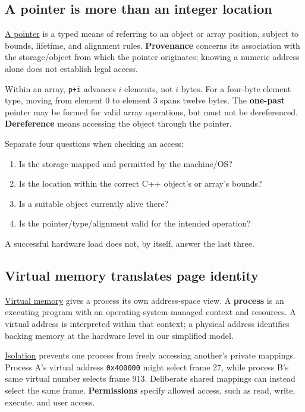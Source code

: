 \subsection{A pointer is more than an integer location}\label{01-foundations-i-ch002-a-pointer-is-more-than-an-integer-location}

\hyperref[appendix-6af5921bc853]{A pointer} is a typed means of referring to an object or array position, subject to bounds, lifetime, and alignment rules. \textbf{Provenance} concerns its association with the storage/object from which the pointer originates; knowing a numeric address alone does not establish legal access.

Within an array, \texttt{p+i} advances \(i\) elements, not \(i\) bytes. For a four-byte element type, moving from element 0 to element 3 spans twelve bytes. The \textbf{one-past} pointer may be formed for valid array operations, but must not be dereferenced. \textbf{Dereference} means accessing the object through the pointer.

Separate four questions when checking an access:

\begin{enumerate}
\def\labelenumi{\arabic{enumi}.}
\tightlist
\item
  Is the storage mapped and permitted by the machine/OS?
\item
  Is the location within the correct C++ object's or array's bounds?
\item
  Is a suitable object currently alive there?
\item
  Is the pointer/type/alignment valid for the intended operation?
\end{enumerate}

A successful hardware load does not, by itself, answer the last three.

\subsection{Virtual memory translates page identity}\label{01-foundations-i-ch002-virtual-memory-translates-page-identity}

\hyperref[appendix-18ee4f913c3c]{Virtual memory} gives a process its own address-space view. A \textbf{process} is an executing program with an operating-system-managed context and resources. A virtual address is interpreted within that context; a physical address identifies backing memory at the hardware level in our simplified model.

\hyperref[appendix-c2a9ad1e2b49]{Isolation} prevents one process from freely accessing another's private mappings. Process A's virtual address \texttt{0x400000} might select frame 27, while process B's same virtual number selects frame 913. Deliberate shared mappings can instead select the same frame. \textbf{Permissions} specify allowed access, such as read, write, execute, and user access.

